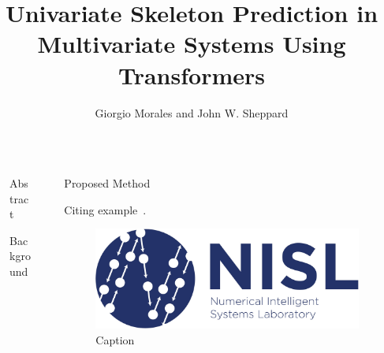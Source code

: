 \documentclass[final]{beamer}
\title{Univariate Skeleton Prediction in Multivariate Systems Using Transformers}
\author{Giorgio Morales and John W. Sheppard}
\institute[shortinst]{Montana State University}
\newlength{\sepwidth}
\newlength{\colwidth}
\newcommand{\separatorcolumn}{\begin{column}{\sepwidth}\end{column}}
\begin{document}

\begin{frame}[t]
\begin{columns}[t]
\separatorcolumn

\begin{column}{\colwidth}

  \begin{block}{Abstract}

    \lipsum[2-3] 

  \end{block}

  \begin{block}{Background}

    \lipsum[2-5] 

  \end{block}

\end{column}




\separatorcolumn




\begin{column}{\colwidth}

  \begin{block}{Proposed Method}

    

    \lipsum[2-5]
    Citing example~\cite{MultiSetSR}.

    \vspace{4ex}

    \begin{figure}
        \centering
        \includegraphics[width=0.8\linewidth]{logos/nisl-logo-small.jpg}
        \caption{Caption}
        \label{fig:enter-label}
    \end{figure}


\end{block}
\end{column}
\end{columns}
\end{frame}
\end{document}

